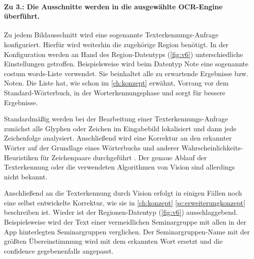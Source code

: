 \documentclass[notables, nomenclature, oneside, 150]{HSMW-Thesis}
\begin{document}
				\paragraph*{Zu 3.: Die Ausschnitte werden in die ausgewählte OCR-Engine überführt.}
					Zu jedem Bildausschnitt wird eine sogenannte Texterkennungs-Anfrage konfiguriert. Hierfür wird weiterhin die zugehörige Region benötigt. In der Konfiguration werden an Hand des Region-Datentyps (\ref{fig:v6}) unterschiedliche Einstellungen getroffen. Beispielsweise wird beim Datentyp Note eine sogenannte costum words-Liste verwendet. Sie beinhaltet alle zu erwartende Ergebnisse bzw. Noten. Die Liste hat, wie schon im \autoref{ch:konzept} erwähnt, Vorrang vor dem Standard-Wörterbuch, in der Worterkennungsphase und sorgt für bessere Ergebnisse. %
						
					Standardmäßig werden bei der Bearbeitung einer Texterkennungs-Anfrage zunächst alle Glyphen oder Zeichen im Eingabebild lokalisiert und dann jede Zeichenfolge analysiert. Anschließend wird eine Korrektur an den erkannter Wörter auf der Grundlage eines Wörterbuchs und anderer Wahrscheinlichkeits-Heuristiken für Zeichenpaare durchgeführt \cite{apple_text_2019}. Der genaue Ablauf der Texterkennung oder die verwendeten Algorithmen von Vision sind allerdings nicht bekannt. 
				
					Anschließend an die Texterkennung durch Vision erfolgt in einigen Fällen noch eine selbst entwickelte Korrektur, wie sie in \autoref{ch:konzept} \autoref{sc:erweiterungkonzept} beschreiben ist. Wieder ist der Regionen-Datentyp (\ref{fig:v6}) ausschlaggebend. Beispielsweise wird der Text einer vermeidlichen Seminargruppe mit allen in der App hinterlegten Seminargruppen verglichen. Der Seminargruppen-Name mit der größten Übereinstimmung wird mit dem erkannten Wort ersetzt und die confidence gegebenenfalls angepasst.
				
\end{document}
